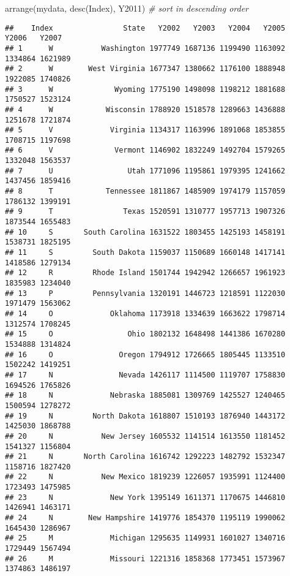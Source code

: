 \documentclass[
]{article}
\newenvironment{Shaded}{\begin{snugshade}}{\end{snugshade}}
\newcommand{\CommentTok}[1]{\textcolor[rgb]{0.56,0.35,0.01}{\textit{#1}}}
\newcommand{\FunctionTok}[1]{\textcolor[rgb]{0.00,0.00,0.00}{#1}}
\newcommand{\NormalTok}[1]{#1}
\begin{document}
\begin{Shaded}
\begin{Highlighting}[]
\FunctionTok{arrange}\NormalTok{(mydata, }\FunctionTok{desc}\NormalTok{(Index), Y2011) }\CommentTok{\# sort in descending order}
\end{Highlighting}
\end{Shaded}

\begin{verbatim}
##    Index                State   Y2002   Y2003   Y2004   Y2005   Y2006   Y2007
## 1      W           Washington 1977749 1687136 1199490 1163092 1334864 1621989
## 2      W        West Virginia 1677347 1380662 1176100 1888948 1922085 1740826
## 3      W              Wyoming 1775190 1498098 1198212 1881688 1750527 1523124
## 4      W            Wisconsin 1788920 1518578 1289663 1436888 1251678 1721874
## 5      V             Virginia 1134317 1163996 1891068 1853855 1708715 1197698
## 6      V              Vermont 1146902 1832249 1492704 1579265 1332048 1563537
## 7      U                 Utah 1771096 1195861 1979395 1241662 1437456 1859416
## 8      T            Tennessee 1811867 1485909 1974179 1157059 1786132 1399191
## 9      T                Texas 1520591 1310777 1957713 1907326 1873544 1655483
## 10     S       South Carolina 1631522 1803455 1425193 1458191 1538731 1825195
## 11     S         South Dakota 1159037 1150689 1660148 1417141 1418586 1279134
## 12     R         Rhode Island 1501744 1942942 1266657 1961923 1835983 1234040
## 13     P         Pennsylvania 1320191 1446723 1218591 1122030 1971479 1563062
## 14     O             Oklahoma 1173918 1334639 1663622 1798714 1312574 1708245
## 15     O                 Ohio 1802132 1648498 1441386 1670280 1534888 1314824
## 16     O               Oregon 1794912 1726665 1805445 1133510 1502242 1419251
## 17     N               Nevada 1426117 1114500 1119707 1758830 1694526 1765826
## 18     N             Nebraska 1885081 1309769 1425527 1240465 1500594 1278272
## 19     N         North Dakota 1618807 1510193 1876940 1443172 1425030 1868788
## 20     N           New Jersey 1605532 1141514 1613550 1181452 1541327 1156804
## 21     N       North Carolina 1616742 1292223 1482792 1532347 1158716 1827420
## 22     N           New Mexico 1819239 1226057 1935991 1124400 1723493 1475985
## 23     N             New York 1395149 1611371 1170675 1446810 1426941 1463171
## 24     N        New Hampshire 1419776 1854370 1195119 1990062 1645430 1286967
## 25     M             Michigan 1295635 1149931 1601027 1340716 1729449 1567494
## 26     M             Missouri 1221316 1858368 1773451 1573967 1374863 1486197

\end{verbatim}
\end{document}

